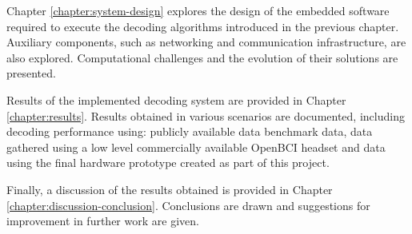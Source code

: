 Chapter \ref{chapter:system-design} explores the design of the embedded software required to execute the decoding algorithms introduced in the previous chapter. Auxiliary components, such as networking and communication infrastructure, are also explored. Computational challenges and the evolution of their solutions are presented. 

Results of the implemented decoding system are provided in Chapter \ref{chapter:results}. Results obtained in various scenarios are documented, including decoding performance using: publicly available data benchmark data, data gathered using a low level commercially available OpenBCI headset and data using the final hardware prototype created as part of this project. 

Finally, a discussion of the results obtained is provided in Chapter \ref{chapter:discussion-conclusion}. Conclusions are drawn and suggestions for improvement in further work are given. 